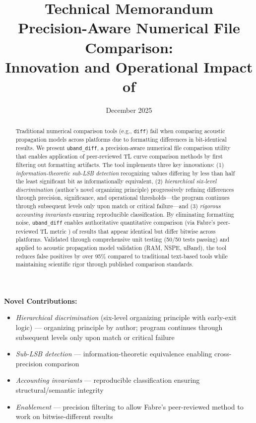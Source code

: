 \documentclass[11pt,letterpaper]{article}
\title{
    \textbf{Technical Memorandum}\\
    \large Precision-Aware Numerical File Comparison:\\
    Innovation and Operational Impact of \ubdiff{}
}
\author{}
\date{December 2025}
\newcommand{\ubdiff}{\texttt{uband\_diff}}
\begin{document}
\maketitle

\begin{abstract}
Traditional numerical comparison tools (e.g., \texttt{diff}) fail when comparing acoustic propagation models across platforms due to formatting differences in bit-identical results. We present \ubdiff{}, a precision-aware numerical file comparison utility that enables application of peer-reviewed TL curve comparison methods \cite{fabre2009} by first filtering out formatting artifacts. The tool implements three key innovations: (1) \emph{information-theoretic sub-LSB detection} recognizing values differing by less than half the least significant bit as informationally equivalent, (2) \emph{hierarchical six-level discrimination} (author's novel organizing principle) progressively refining differences through precision, significance, and operational thresholds—the program continues through subsequent levels only upon match or critical failure—and (3) \emph{rigorous accounting invariants} ensuring reproducible classification. By eliminating formatting noise, \ubdiff{} enables authoritative quantitative comparison (via Fabre's peer-reviewed TL metric \cite{fabre2009}) of results that appear identical but differ bitwise across platforms. Validated through comprehensive unit testing (50/50 tests passing) and applied to acoustic propagation model validation (RAM, NSPE, uBand), the tool reduces false positives by over 95\% compared to traditional text-based tools while maintaining scientific rigor through published comparison standards.
\end{abstract}


\noindent \textbf{Novel Contributions:}
\begin{itemize}
    \item \emph{Hierarchical discrimination} (six-level organizing principle with early-exit logic) — organizing principle by author; program continues through subsequent levels only upon match or critical failure
    \item \emph{Sub-LSB detection} — information-theoretic equivalence enabling cross-precision comparison
    \item \emph{Accounting invariants} — reproducible classification ensuring structural/semantic integrity
    \item \emph{Enablement} — precision filtering to allow Fabre's peer-reviewed method to work on bitwise-different results
\end{itemize}
\end{document}
